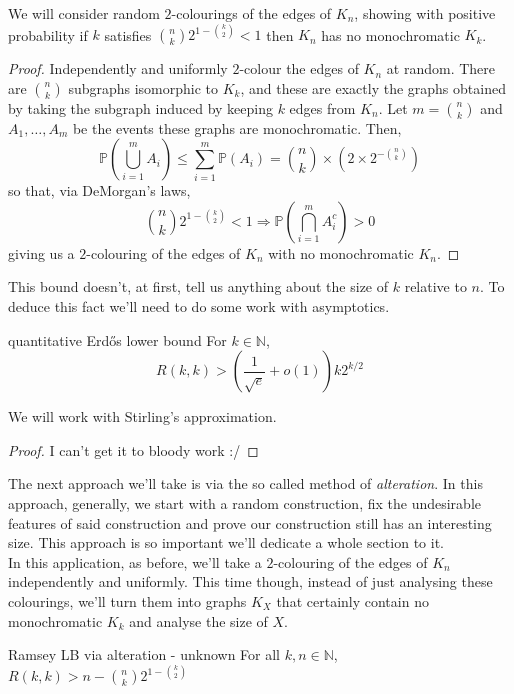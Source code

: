 \documentclass{article}
\begin{document}
We will consider random $2$-colourings of the edges of $K_n$, showing with positive probability if 
$k$ satisfies $\binom{n}{k}2^{1 - \binom{k}{2}} < 1$ then $K_n$ has no monochromatic $K_k$. 

\begin{proof}
    Independently and uniformly $2$-colour the edges of $K_n$ at random. There are $\binom{n}{k}$ 
    subgraphs isomorphic to $K_k$, and these are exactly the graphs obtained by taking the subgraph induced by 
    keeping $k$ edges from $K_n$. Let $m = \binom{n}{k}$ and $A_1, \dots, A_{m}$ be the events these graphs are monochromatic. 
    Then, 
    \[\mathbb{P}\left(\bigcup_{i = 1}^{m}A_i\right) \leq \sum_{i = 1}^{m}\mathbb{P}(A_i) = 
    \binom{n}{k} \times (2 \times 2^{- \binom{n}{k}})\]
    so that, via DeMorgan's laws,
    \[\binom{n}{k}2^{1 - \binom{k}{2}} < 1 \Longrightarrow \mathbb{P}\left(\bigcap_{i = 1}^{m}A_i^c\right) > 0\]
    giving us a $2$-colouring of the edges of $K_n$ with no monochromatic $K_n$. 
\end{proof}

This bound doesn't, at first, tell us anything about the size of $k$ relative to $n$. To deduce this fact we'll 
need to do some work with asymptotics.

\begin{proposition}[]{quantitative Erd\H{o}s lower bound}
    For $k \in \mathbb{N}$, 
    \[R(k, k) > \left(\frac{1}{\sqrt{e}} + o(1)\right)k2^{k/2}\]
\end{proposition}

We will work with Stirling's approximation.

\begin{proof}
    I can't get it to bloody work :/
\end{proof}

The next approach we'll take is via the so called method of {\it alteration}. In this approach, generally,
we start with a random construction, fix the undesirable features of said construction and prove our construction 
still has an interesting size. This approach is so important we'll dedicate a whole section to it. \\ 

In this application, as before, we'll take a $2$-colouring of the edges of $K_n$ independently and uniformly. This 
time though, instead of just analysing these colourings, we'll turn them into graphs $K_X$ that certainly contain no 
monochromatic $K_k$ and analyse the size of $X$. 

\begin{proposition}[]{Ramsey LB via alteration - unknown}
    For all $k, n \in \mathbb{N}$, $R(k,k) > n - \binom{n}{k}2^{1-\binom{k}{2}}$
\end{proposition}
\end{document}
